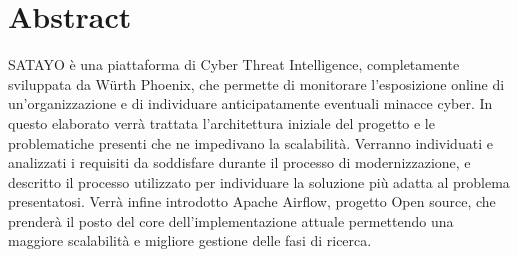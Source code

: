 \chapter*{Abstract}
\label{cha:abtract}

SATAYO è una piattaforma di Cyber Threat Intelligence, completamente sviluppata da
Würth Phoenix, che permette di monitorare l'esposizione online di un'organizzazione
e di individuare anticipatamente eventuali minacce cyber. In questo elaborato verrà
trattata l'architettura iniziale del progetto e le problematiche presenti che ne
impedivano la scalabilità. Verranno individuati e analizzati i requisiti da
soddisfare durante il processo di modernizzazione, e descritto il processo utilizzato
per individuare la soluzione più adatta al problema presentatosi. Verrà infine
introdotto Apache Airflow, progetto Open source, che prenderà il posto del core
dell'implementazione attuale permettendo una maggiore scalabilità e migliore
gestione delle fasi di ricerca.